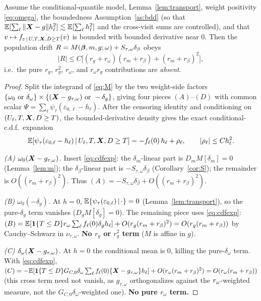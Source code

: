 \begin{lemma}\label{lem:sharp}
Assume the conditional-quantile model, Lemma~\ref{lem:transport}, weight
positivity \eqref{eq:omega}, the boundedness Assumption~\ref{as:bdd} (so that
$\mathbb{E}[\sum_\ell\|\bm{X}-g\|h_\ell^2]\lesssim\mathbb{E}[\sum_\ell h_\ell^2]$ and the cross-visit
sums are controlled), and that
$v\mapsto f_{\varepsilon\,\vert\, U,T,\bm{X},D\ge T}(v)$ is bounded with bounded
derivative near $0$. Then the population drift
$R=M(\bm{\beta},m,g;\omega)+S_{\tau,\omega}\delta_\beta$ obeys
\[
|R|\le C\big[(r_g+r_\omega)(r_m+r_\beta)+(r_m+r_\beta)^2\big],
\]
i.e.\ the pure $r_g$, $r_g^2$, $r_\omega$, and $r_\omega r_g$ contributions are
\emph{absent}.
\end{lemma}
\begin{proof}
Split the integrand of \eqref{eq:M} by the two weight-side factors
$\{\omega_0\text{ or }\delta_\omega\}\times\{(\bm{X}-g_{\tau,\omega})\text{ or
}-\delta_g\}$, giving four pieces $(A)$--$(D)$ with common scalar
$\Psi=\sum_\ell\psi_\tau(\varepsilon_{0,\ell}-h_\ell)$. After the censoring
identity and conditioning on $(U_\ell,T,\bm{X},D\ge T)$, the bounded-derivative
density gives the exact conditional-c.d.f.\ expansion
\begin{equation}
\mathbb{E}[\psi_\tau(\varepsilon_{0,\ell}-h_\ell)\,\vert\, U_\ell,T,\bm{X},D\ge T]
=-f_\ell(0)\,h_\ell+\rho_\ell,\qquad |\rho_\ell|\le C h_\ell^2.
\label{eq:cdfexp}
\end{equation}

\emph{(A) $\omega_0(\bm{X}-g_{\tau,\omega})$.} Insert \eqref{eq:cdfexp}: the
$\delta_m$-linear part is $D_mM[\delta_m]=0$ (Lemma~\ref{lem:m}); the
$\delta_\beta$-linear part is $-S_{\tau,\omega}\delta_\beta$
(Corollary~\ref{cor:S}); the remainder is $O((r_m+r_\beta)^2)$. Thus
$(A)=-S_{\tau,\omega}\delta_\beta+O((r_m+r_\beta)^2)$.

\emph{(B) $\omega_0(-\delta_g)$.} At $h=0$,
$\mathbb{E}\{\psi_\tau(\varepsilon_{0,\ell})\,\vert\,\cdot\}=0$
(Lemma~\ref{lem:transport}), so the pure-$\delta_g$ term vanishes
($D_gM[\delta_g]=0$). The remaining piece uses \eqref{eq:cdfexp}:
$(B)=\mathbb{E}[\mathbf{1}\{T\le D\}r_{\omega}\sum_\ell f_\ell(0)\delta_g h_\ell]+O(r_g(r_m+r_\beta)^2)
=O(r_g(r_m+r_\beta))$ by Cauchy--Schwarz in $\nu_{\tau,\omega}$. \textbf{No
$r_g$ or $r_g^2$ term} ($M$ is affine in $g$).

\emph{(C) $\delta_\omega(\bm{X}-g_{\tau,\omega})$.} At $h=0$ the conditional mean is
$0$, killing the pure-$\delta_\omega$ term. With \eqref{eq:cdfexp},
$(C)=-\mathbb{E}[\mathbf{1}\{T\le D\}G_{C,0}\delta_\omega\sum_\ell f_\ell(0)
\{\bm{X}-g_{\tau,\omega}\}h_\ell]+O(r_\omega(r_m+r_\beta)^2)=O(r_\omega(r_m+r_\beta))$
(this cross term need not vanish, as $g_{\tau,\omega}$ orthogonalizes against the
$r_{\omega}$-weighted measure, not the $G_{C,0}\delta_\omega$-weighted one).
\textbf{No pure $r_\omega$ term.}


\end{proof}
